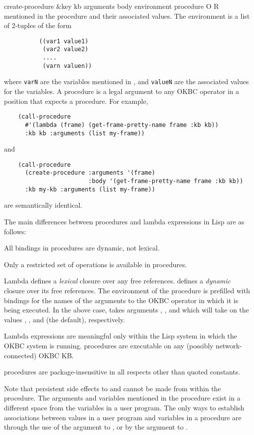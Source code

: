 \begin{okbcop}{create-procedure}{ \&key kb arguments body environment} { procedure } { O } { R } {  }
          mentioned in the procedure  and their associated values.
          The environment is a list of 2-tuples of the form
          \begin{verbatim}
          ((var1 value1)
           (var2 value2)
           ....
           (varn valuen))
          \end{verbatim}
          where {\tt varN} are the variables mentioned in , and
          {\tt valueN} are the associated values for the variables.
   \eitem
   A procedure is a legal argument to any OKBC operator in a position that
   expects a procedure.
   For example,
   \begin{verbatim}
    (call-procedure
      #'(lambda (frame) (get-frame-pretty-name frame :kb kb))
      :kb kb :arguments (list my-frame))
   \end{verbatim}
   and
   \begin{verbatim}
    (call-procedure
      (create-procedure :arguments '(frame)
                        :body '(get-frame-pretty-name frame :kb kb))
      :kb my-kb :arguments (list my-frame))
   \end{verbatim}
   are semantically identical.

   The main differences between
   procedures and lambda expressions in Lisp are as follows:
   \benum
   \item All bindings in procedures are dynamic, not lexical.
   \item Only a restricted set of operations is available in procedures.
   \item Lambda defines a {\em lexical} closure over any free references.
      defines a {\em dynamic} closure over its free
     references.  The environment of the procedure is
     prefilled with bindings for the names of the arguments to
     the OKBC operator in which it is being executed.  In the above
     case,  takes arguments ,
     , and 
     which will take on the values , , and
      (the default), respectively.
   \item Lambda expressions are meaningful only within the Lisp system
     in which the OKBC system is running.  procedures are
     executable on any (possibly network-connected) OKBC KB.
   \item procedures are package-insensitive in all respects
   other than quoted constants.
   \eenum

   Note that persistent side effects to  and 
   cannot be made from within the procedure.  The arguments and variables
   mentioned in the procedure exist in a different space from the variables
   in a user program.  The only ways to establish associations between values
   in a user program and variables in a procedure are through the use of the
    argument to , or by the
    argument to .
\end{okbcop}

